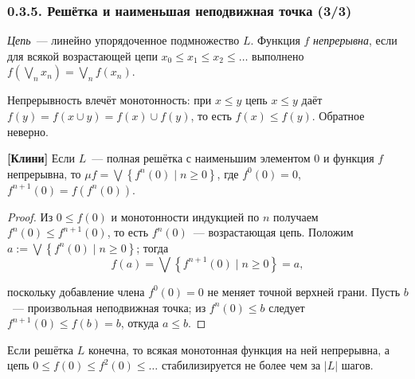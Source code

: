 \documentclass[mathserif,12pt,aspectratio=169]{beamer}
\def\emразделенной{\em разделенной}
\renewcommand{\index}[1]{}
\def\em#1{\it\color{blue}#1}
\def\NB#1{{\bf\color{brown}#1}}
\def\odmkey#1#2{{\it\color{red} #1}\index{#2}}
\def\Set#1#2{\left\{ #1 \mid #2 \right\}}
\def\Assign{\operatorname{:=}}
\let\le\leqslant
\begin{document}
\begin{frame}
\frametitle{0.3.5. Решётка и наименьшая неподвижная точка (3/3)}

{\em Цепь}~--- линейно упорядоченное подмножество $L$. Функция $f$
\odmkey{непрерывна}{Функция!непрерывная}, если для всякой возрастающей цепи
$x_0\le x_1\le x_2\le\dots$ выполнено
$f\left(\bigvee_n x_n\right)=\bigvee_n f(x_n)$.

\begin{remark}
Непрерывность влечёт монотонность: при $x\le y$ цепь $x\le y$ даёт
$f(y)=f(x\cup y)=f(x)\cup f(y)$, то есть $f(x)\le f(y)$. Обратное неверно.
\end{remark}

\begin{theorem} \NB{[Клини]}
Если $L$~--- полная решётка с наименьшим элементом $0$ и функция $f$ непрерывна,
то $\mu f=\bigvee\Set{f^n(0)}{n\geqslant 0}$, где $f^0(0)=0$,
$f^{n+1}(0)=f(f^n(0))$.
\end{theorem}
\vspace{-4pt}

\begin{proof}
Из $0\le f(0)$ и монотонности индукцией по $n$ получаем $f^n(0)\le f^{n+1}(0)$,
то есть $f^n(0)$~--- возрастающая цепь. Положим
$a\Assign\bigvee\Set{f^n(0)}{n\geqslant 0}$; тогда
\vspace{-6pt}
$$f(a)=\bigvee\Set{f^{n+1}(0)}{n\geqslant 0}=a,$$
\vspace{-18pt}

поскольку добавление члена $f^0(0)=0$ не меняет точной верхней грани. Пусть
$b$~--- произвольная неподвижная точка; из $f^n(0)\le b$ следует
$f^{n+1}(0)\le f(b)=b$, откуда $a\le b$.
\end{proof}
\vspace{-4pt}
\begin{corollary}
Если решётка $L$ конечна, то всякая монотонная функция на ней непрерывна, а цепь
$0\le f(0)\le f^2(0)\le\dots$ стабилизируется не более чем за $|L|$ шагов.
\end{corollary}

\end{frame}
\end{document}
